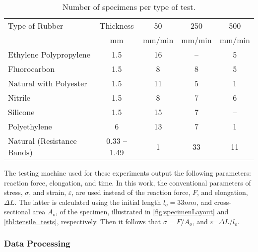 \begin{table}[htb!]
    \centering
    \caption{Number of specimens per type of test.}
    \begin{tabular}{lcccc}
    \toprule
    Type of Rubber & Thickness &  50 & 250 & 500\\
     & mm & mm/min & mm/min & mm/min \\
    \hline
    Ethylene Polypropylene   	&  1.5 & 16 & -- & 5\\
    Fluorocarbon              	&  1.5 & 8 & 8 & 5\\
    Natural with Polyester   	&  1.5 & 11 & 5 & 1\\
    Nitrile                   	&  1.5 & 8 & 7 & 6\\
    Silicone                  	&  1.5 & 15 & 7 & --\\
    Polyethylene              	&  6 & 13 & 7 & 1\\
    Natural (Resistance Bands)	& 0.33 -- 1.49 & 1 & 33 & 11\\    
    \bottomrule
    \end{tabular}
    \label{tbl:tensile_tests}
\end{table}

The testing machine used for these experiments output the following parameters: reaction force, elongation, and time. In this work, the conventional parameters of stress, $\sigma$, and strain, $\varepsilon$, are used instead of the reaction force, $F$, and elongation, $\Delta L$. The latter is calculated using the initial length $l_o=33 mm$, and cross-sectional area $A_o$, of the specimen, illustrated in \autoref{fig:specimenLayout} and \autoref{tbl:tensile_tests}, respectively. Then it follows that $\sigma=F/A_o$, and $\varepsilon$=$\Delta L$/$l_o$.

\subsubsection{Data Processing}

